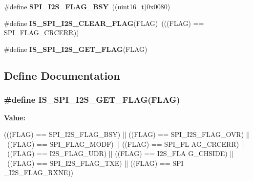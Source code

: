 \begin{DoxyCompactItemize}
\item 
\hypertarget{group__SPI__I2S__flags__definition_ga4551095df1365cf2a760282a34279b3c}{
\#define {\bfseries SPI\_\-I2S\_\-FLAG\_\-BSY}~((uint16\_\-t)0x0080)}
\label{group__SPI__I2S__flags__definition_ga4551095df1365cf2a760282a34279b3c}

\item 
\hypertarget{group__SPI__I2S__flags__definition_gab16c7f47712871b8f1b97de43841856f}{
\#define {\bfseries IS\_\-SPI\_\-I2S\_\-CLEAR\_\-FLAG}(FLAG)~(((FLAG) == SPI\_\-FLAG\_\-CRCERR))}
\label{group__SPI__I2S__flags__definition_gab16c7f47712871b8f1b97de43841856f}

\item 
\#define {\bfseries IS\_\-SPI\_\-I2S\_\-GET\_\-FLAG}(FLAG)
\end{DoxyCompactItemize}


\subsection{Define Documentation}
\hypertarget{group__SPI__I2S__flags__definition_ga1241471a018bc63ed140089ce8334b4f}{
\subsubsection[{IS\_\-SPI\_\-I2S\_\-GET\_\-FLAG}]{\setlength{\rightskip}{0pt plus 5cm}\#define IS\_\-SPI\_\-I2S\_\-GET\_\-FLAG(FLAG)}}
\label{group__SPI__I2S__flags__definition_ga1241471a018bc63ed140089ce8334b4f}
{\bfseries Value:}
\begin{DoxyCode}
(((FLAG) == SPI_I2S_FLAG_BSY) || ((FLAG) == SPI_I2S_FLAG_OVR) || \
                                   ((FLAG) == SPI_FLAG_MODF) || ((FLAG) == SPI_FL
      AG_CRCERR) || \
                                   ((FLAG) == I2S_FLAG_UDR) || ((FLAG) == I2S_FLA
      G_CHSIDE) || \
                                   ((FLAG) == SPI_I2S_FLAG_TXE) || ((FLAG) == SPI
      _I2S_FLAG_RXNE))
\end{DoxyCode}
